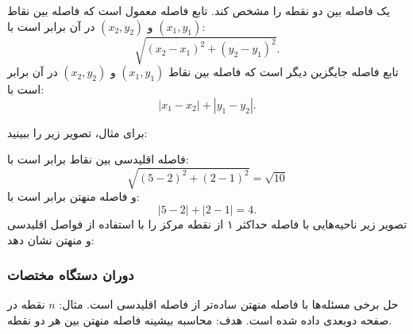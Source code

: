 یک  فاصله بین دو نقطه را مشخص کند.
تابع فاصله معمول  است که فاصله بین نقاط $(x_1,y_1)$ و $(x_2,y_2)$ در آن برابر است با:
\[\sqrt{(x_2-x_1)^2+(y_2-y_1)^2}.\]
تابع فاصله جایگزین دیگر  است
که فاصله بین نقاط $(x_1,y_1)$ و $(x_2,y_2)$ در آن برابر است با:
\[|x_1-x_2|+|y_1-y_2|.\]
\begin{samepage}
برای مثال، تصویر زیر را ببینید:
\begin{center}
\end{center}
\end{samepage}
فاصله اقلیدسی بین نقاط برابر است با:
\[\sqrt{(5-2)^2+(2-1)^2}=\sqrt{10}\]
و فاصله منهتن برابر است با:
\[|5-2|+|2-1|=4.\]
تصویر زیر ناحیه‌هایی با فاصله حداکثر ۱ از نقطه مرکز را با استفاده از فواصل اقلیدسی و منهتن نشان دهد:
\begin{center}
\end{center}

\subsubsection{دوران دستگاه مختصات}

حل برخی مسئله‌ها با فاصله منهتن ساده‌تر از فاصله اقلیدسی است.
مثال: $n$ نقطه در صفحه دو‌بعدی داده شده است.
هدف: محاسبه بیشینه فاصله منهتن بین هر دو نقطه.

